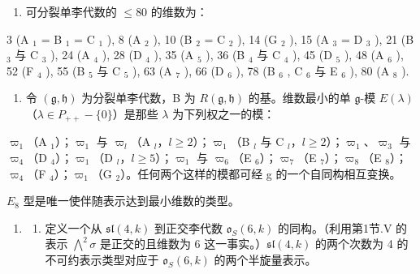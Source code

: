 
\begin{enumerate}
\def\labelenumi{\arabic{enumi})}
\tightlist
\item
  可分裂单李代数的 \(\leq 80\) 的维数为：
\end{enumerate}

3 (A \(_{1}\) = B \(_{1}\) = C \(_{1}\) ), 8 (A \(_{2}\) ), 10 (B \(_{2}\) = C \(_{2}\) ), 14 (G \(_{2}\) ), 15 (A \(_{3}\) = D \(_{3}\) ), 21 (B \(_{3}\) 与 C \(_{3}\) ), 24 (A \(_{4}\) ), 28 (D \(_{4}\) ), 35 (A \(_{5}\) ), 36 (B \(_{4}\) 与 C \(_{4}\) ), 45 (D \(_{5}\) ), 48 (A \(_{6}\) ), 52 (F \(_{4}\) ), 55 (B \(_{5}\) 与 C \(_{5}\) ), 63 (A \(_{7}\) ), 66 (D \(_{6}\) ), 78 (B \(_{6}\) , C \(_{6}\) 与 E \(_{6}\) ), 80 (A \(_{8}\) ).

\begin{enumerate}
\def\labelenumi{\arabic{enumi})}
\setcounter{enumi}{1}
\tightlist
\item
  令 \((\mathfrak{g},\mathfrak{h})\) 为分裂单李代数，B 为 \(R(\mathfrak{g},\mathfrak{h})\) 的基。维数最小的单 \(\mathfrak{g}\)-模 \(E(\lambda)\)（\(\lambda \in P_{++} - \{0\}\)）是那些 \(\lambda\) 为下列权之一的模：
\end{enumerate}

\(\varpi_{1}\)（A \(_{1}\)）；\(\varpi_{1}\) 与 \(\varpi_{l}\)（A \(_{l}\)，\(l \geq 2\)）；\(\varpi_{1}\)（B \(_{l}\) 与 C \(_{l}\)，\(l \geq 2\)）；\(\varpi_{1}\)、\(\varpi_{3}\) 与 \(\varpi_{4}\)（D \(_{4}\)）；\(\varpi_{1}\)（D \(_{l}\)，\(l \geq 5\)）；\(\varpi_{1}\) 与 \(\varpi_{6}\)（E \(_{6}\)）；\(\varpi_{7}\)（E \(_{7}\)）；\(\varpi_{8}\)（E \(_{8}\)）；\(\varpi_{4}\)（F \(_{4}\)）；\(\varpi_{1}\)（G \(_{2}\)）。任何两个这样的模都可经 g 的一个自同构相互变换。

\(E_{8}\) 型是唯一使伴随表示达到最小维数的类型。

\begin{enumerate}
\def\labelenumi{\arabic{enumi})}
\setcounter{enumi}{2}
\tightlist
\item
  \begin{enumerate}
  \def\labelenumii{\alph{enumii})}
  \tightlist
  \item
    定义一个从 \(\mathfrak{sl}(4,k)\) 到正交李代数 \(\mathfrak{o}_S(6,k)\) 的同构。（利用第1节.V 的表示 \(\bigwedge^2\sigma\) 是正交的且维数为 6 这一事实。）\(\mathfrak{sl}(4,k)\) 的两个次数为 4 的不可约表示类型对应于 \(\mathfrak{o}_S(6,k)\) 的两个半旋量表示。
  \end{enumerate}
\end{enumerate}

